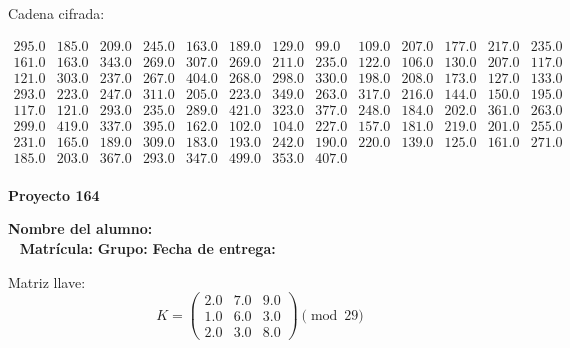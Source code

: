 \documentclass[12pt]{article}
\begin{document}
Cadena cifrada:
\begin{center}
$\begin{array}{lllllllllllll}
295.0 & 185.0 & 209.0 & 245.0 & 163.0 & 189.0 & 129.0 & 99.0 & 109.0 & 207.0 & 177.0 & 217.0 & 235.0\\
161.0 & 163.0 & 343.0 & 269.0 & 307.0 & 269.0 & 211.0 & 235.0 & 122.0 & 106.0 & 130.0 & 207.0 & 117.0\\
121.0 & 303.0 & 237.0 & 267.0 & 404.0 & 268.0 & 298.0 & 330.0 & 198.0 & 208.0 & 173.0 & 127.0 & 133.0\\
293.0 & 223.0 & 247.0 & 311.0 & 205.0 & 223.0 & 349.0 & 263.0 & 317.0 & 216.0 & 144.0 & 150.0 & 195.0\\
117.0 & 121.0 & 293.0 & 235.0 & 289.0 & 421.0 & 323.0 & 377.0 & 248.0 & 184.0 & 202.0 & 361.0 & 263.0\\
299.0 & 419.0 & 337.0 & 395.0 & 162.0 & 102.0 & 104.0 & 227.0 & 157.0 & 181.0 & 219.0 & 201.0 & 255.0\\
231.0 & 165.0 & 189.0 & 309.0 & 183.0 & 193.0 & 242.0 & 190.0 & 220.0 & 139.0 & 125.0 & 161.0 & 271.0\\
185.0 & 203.0 & 367.0 & 293.0 & 347.0 & 499.0 & 353.0 & 407.0\\
\end{array}$
\end{center}

\newpage


\textbf{Proyecto 164}

\textbf{Nombre del alumno:} \underline{\hspace{13cm}}\\\
\vspace{1cm}
\textbf{Matrícula:} \underline{\hspace{4cm}} \hspace{1cm}
\textbf{Grupo:} \underline{\hspace{2cm}}
\textbf{Fecha de entrega:} \underline{\hspace{2cm}}

\medskip

Matriz llave:
\[
K = \begin{pmatrix}
2.0 & 7.0 & 9.0\\
1.0 & 6.0 & 3.0\\
2.0 & 3.0 & 8.0
\end{pmatrix} \pmod{29}
\]
\end{document}
